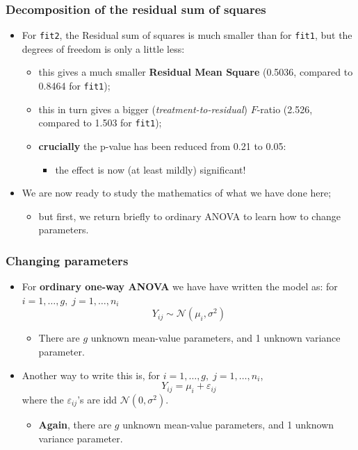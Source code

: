 \documentclass[a4paper]{article}
\begin{document}
\subsubsection{Decomposition of the residual sum of squares}
\begin{itemize}
	\item For \lstinline|fit2|, the Residual sum of squares is much smaller than for \lstinline|fit1|, but the degrees of freedom is only a little less:
	\begin{itemize}
		\item this gives a much smaller \textbf{Residual Mean Square} (0.5036, compared to 0.8464 for \lstinline|fit1|);
		\item this in turn gives a bigger (\textit{treatment-to-residual}) \( F \)-ratio (2.526, compared to 1.503 for \lstinline|fit1|);
		\item \textbf{crucially} the p-value has been reduced from 0.21 to 0.05:
		\begin{itemize}
			\item the effect is now (at least mildly) significant!
		\end{itemize}
	\end{itemize}
	\item We are now ready to study the mathematics of what we have done here;
	\begin{itemize}
		\item but first, we return briefly to ordinary ANOVA to learn how to change parameters.
	\end{itemize}
\end{itemize}
\subsubsection{Changing parameters}
\begin{itemize}
	\item For \textbf{ordinary one-way ANOVA} we have have written the model as: for \( i = 1,\dotsc,g,\;j = 1,\dotsc,n_i \) 
	\[
		Y_{ij} \sim \mathcal{N}(\mu_i,\sigma^2)
	\]
	\begin{itemize}
		\item There are \( g \) unknown mean-value parameters, and 1 unknown variance parameter.
	\end{itemize}
	\item Another way to write this is, for \( i = 1,\dotsc,g,\;j = 1,\dotsc,n_i \),
	\[
		Y_{ij} = \mu_i + \varepsilon_{ij}
	\]
	where the \( \varepsilon_{ij} \)'s are idd \( \mathcal{N}(0,\sigma^2) \).
	\begin{itemize}
		\item \textbf{Again}, there are \( g \) unknown mean-value parameters, and 1 unknown variance parameter.
	\end{itemize}
\end{itemize}
\end{document}
